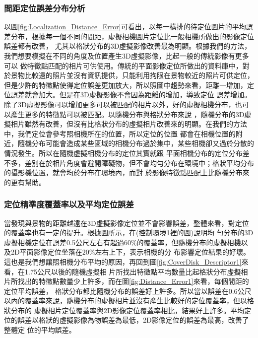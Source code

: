 \subsubsection{間距定位誤差分布分析}	
	
	以圖\ref{fig:Localization_Distance_Error}可看出，以每一橫排的待定位圖片的平均誤差分布，根據每一個不同的間距，虛擬相機圖片定位比一般相機所做出的影像定位誤差都有改善，
尤其以格狀分布的3D虛擬影像改善最為明顯。根據我們的方法，我們想要模擬在不同的角度及位置產生3D虛擬影像，比起一般的傳統影像有更多可以
做特徵點匹配的相片可供使用。傳統的平面影像定位所做出的資料庫中，對於景物比較遠的照片並沒有資訊提供，只能利用拘限在景物較近的照片可供定位，
但是少許的特徵點使得定位誤差更加放大，所以照圖中趨勢來看，距離一增加，定位誤差就會加大。但是在3D虛擬影像不會因為距離的增加，導致定位
誤差增加。除了3D虛擬影像可以增加更多可以被匹配的相片以外，好的虛擬相機分布，也可以產生更多的特徵點可以被匹配。以隨機分布與格狀分布來說
，隨機分布的3D虛擬相片雖然有改善，但沒有比格狀分布的虛擬相片改善來的明顯。在我們的方法中，我們定位會參考照相機所在的位置，所以定位的位置
都會在相機位置的附近，隨機分布可能會造成某些區域的相機分布過於集中，某些相機卻又過於分散的情況發生。所以在隨機虛擬相機分布的定位其實就跟
平面相機分布的定位分布差不多，差別在於相片角度會避開障礙物，但不會均勻分布在環境中；格狀平均分布的攝影機位置，就會均於分布在環境內，而對
於影像特徵點匹配上比隨機分布來的更有幫助。


\subsubsection{定位精準度覆蓋率以及平均定位誤差}	

	當發現與景物的距離越遠在3D虛擬影像定位並不會影響誤差，整體來看，對定位的覆蓋率也有一定的提升。根據圖所示，在(控制環境1裡的圖)說明均
勻分布的3D虛擬相機定位在誤差0.5公尺左右有超過$60\%$的覆蓋率，但隨機分布的虛擬相機以及2D平面影像定位坐落在$20\%$左右上下，表示相機的分
布影響定位結果的好壞。這也是我們想讓照相機分布平均的原因，再回到圖\ref{fig:CoverDisk_Descriptor1}來看，在1.75公尺以後的隨機虛擬相
片所找出特徵點平均數量比起格狀分布虛擬相片所找出的特徵點數量少上許多，而在圖\ref{fig:Distance_Error1}來看，每個間距的定位平均誤差，
格狀分布都比隨機分布的誤差好上許多。所以當以誤差在0.6公尺以內的覆蓋率來說，隨機分布的虛擬相片並沒有產生比較好的定位覆蓋率，但以格狀分布的
虛擬相片定位覆蓋率與2D影像定位覆蓋率相比，結果好上許多。平均定位的誤差以格狀的虛擬影像為物誤差為最低，2D影像定位的誤差為最高，改善了整體定
位的平均誤差。


